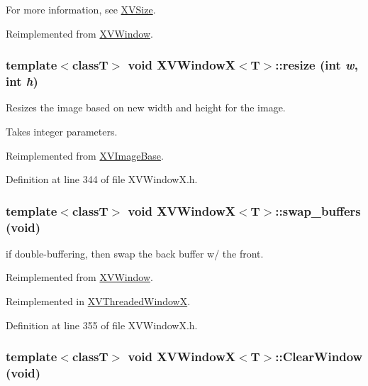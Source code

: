 For more information, see \hyperlink{class_XVSize}{XVSize}. 

Reimplemented from \hyperlink{class_XVWindow_a4}{XVWindow}.\label{XVWindowX_a3}
\hypertarget{class_XVWindowX_a3}{
\subsubsection[resize]{\setlength{\rightskip}{0pt plus 5cm}template$<$classT$>$ void XVWindow\-X$<$T$>$::resize (int {\em w}, int {\em h})}}


Resizes the image based on new width and height for the image.

Takes integer parameters. 

Reimplemented from \hyperlink{class_XVImageBase_a12}{XVImage\-Base}.

Definition at line 344 of file XVWindow\-X.h.\label{XVWindowX_a7}
\hypertarget{class_XVWindowX_a7}{
\subsubsection[swap_buffers]{\setlength{\rightskip}{0pt plus 5cm}template$<$classT$>$ void XVWindow\-X$<$T$>$::swap\_\-buffers (void)}}


if double-buffering, then swap the back buffer w/ the front.



Reimplemented from \hyperlink{class_XVWindow}{XVWindow}.

Reimplemented in \hyperlink{class_XVThreadedWindowX_a5}{XVThreaded\-Window\-X}.

Definition at line 355 of file XVWindow\-X.h.\label{XVWindowX_a11}
\hypertarget{class_XVWindowX_a11}{
\subsubsection[ClearWindow]{\setlength{\rightskip}{0pt plus 5cm}template$<$classT$>$ void XVWindow\-X$<$T$>$::Clear\-Window (void)}}




